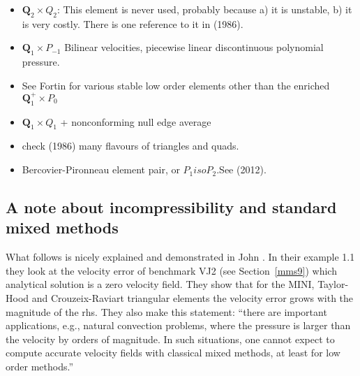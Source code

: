 \begin{itemize}

\item ${\bm Q}_2\times Q_2$: This element is never used, probably because 
a) it is unstable, b) it is very costly. 
There is one reference to it in \textcite{hufb86} (1986).

\item ${\bm Q}_1\times P_{-1}$ Bilinear velocities,  piecewise linear discontinuous polynomial pressure.

\item See Fortin \cite{fort81} for various stable low order elements other than the enriched 
${\bm Q}_1^+ \times P_0$

\item ${\bm Q}_1\times Q_1$ + nonconforming null edge average \cite{fros07}

\item check \textcite{dhhu86} (1986) many flavours of triangles and quads.

\item Bercovier-Pironneau element pair, or $P_1isoP_2$.See \textcite{bocg12} (2012).

\end{itemize}

\subsection{A note about incompressibility and standard mixed methods}

What follows is nicely explained and demonstrated in John \etal \cite{jolm17}. In their 
example 1.1 they look at the velocity error of benchmark VJ2 (see Section~\ref{mms9}) 
which analytical solution is a zero velocity field. They show that for the MINI, 
Taylor-Hood and Crouzeix-Raviart triangular elements the velocity error grows 
with the magnitude of the rhs. They also make this statement:
``there are important applications, e.g., natural
convection problems, where the pressure is larger than the velocity by orders
of magnitude. In such situations, one cannot expect to compute accurate
velocity fields with classical mixed methods, at least for low order methods.''


